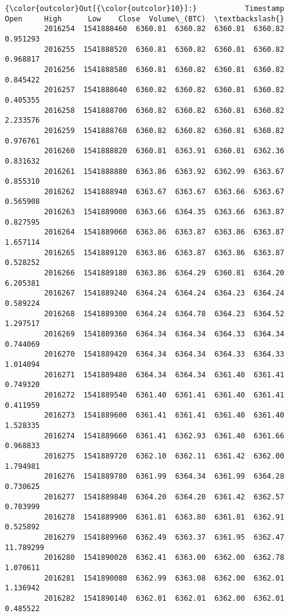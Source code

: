\documentclass[11pt]{article}
\begin{document}
\begin{Verbatim}[commandchars=\\\{\}]
{\color{outcolor}Out[{\color{outcolor}10}]:}           Timestamp     Open     High      Low    Close  Volume\_(BTC)  \textbackslash{}
         2016254  1541888460  6360.81  6360.82  6360.81  6360.82      0.951293   
         2016255  1541888520  6360.81  6360.82  6360.81  6360.82      0.968817   
         2016256  1541888580  6360.81  6360.82  6360.81  6360.82      0.845422   
         2016257  1541888640  6360.82  6360.82  6360.81  6360.82      0.405355   
         2016258  1541888700  6360.82  6360.82  6360.81  6360.82      2.233576   
         2016259  1541888760  6360.82  6360.82  6360.81  6360.82      0.976761   
         2016260  1541888820  6360.81  6363.91  6360.81  6362.36      0.831632   
         2016261  1541888880  6363.86  6363.92  6362.99  6363.67      0.855310   
         2016262  1541888940  6363.67  6363.67  6363.66  6363.67      0.565908   
         2016263  1541889000  6363.66  6364.35  6363.66  6363.87      0.827595   
         2016264  1541889060  6363.86  6363.87  6363.86  6363.87      1.657114   
         2016265  1541889120  6363.86  6363.87  6363.86  6363.87      0.528252   
         2016266  1541889180  6363.86  6364.29  6360.81  6364.20      6.205381   
         2016267  1541889240  6364.24  6364.24  6364.23  6364.24      0.589224   
         2016268  1541889300  6364.24  6364.78  6364.23  6364.52      1.297517   
         2016269  1541889360  6364.34  6364.34  6364.33  6364.34      0.744069   
         2016270  1541889420  6364.34  6364.34  6364.33  6364.33      1.014094   
         2016271  1541889480  6364.34  6364.34  6361.40  6361.41      0.749320   
         2016272  1541889540  6361.40  6361.41  6361.40  6361.41      0.411959   
         2016273  1541889600  6361.41  6361.41  6361.40  6361.40      1.528335   
         2016274  1541889660  6361.41  6362.93  6361.40  6361.66      0.968833   
         2016275  1541889720  6362.10  6362.11  6361.42  6362.00      1.794981   
         2016276  1541889780  6361.99  6364.34  6361.99  6364.28      0.730625   
         2016277  1541889840  6364.20  6364.20  6361.42  6362.57      0.703999   
         2016278  1541889900  6361.81  6363.80  6361.81  6362.91      0.525892   
         2016279  1541889960  6362.49  6363.37  6361.95  6362.47     11.789299   
         2016280  1541890020  6362.41  6363.00  6362.00  6362.78      1.070611   
         2016281  1541890080  6362.99  6363.08  6362.00  6362.01      1.136942   
         2016282  1541890140  6362.01  6362.01  6362.00  6362.01      0.485522   

\end{Verbatim}
\end{document}
